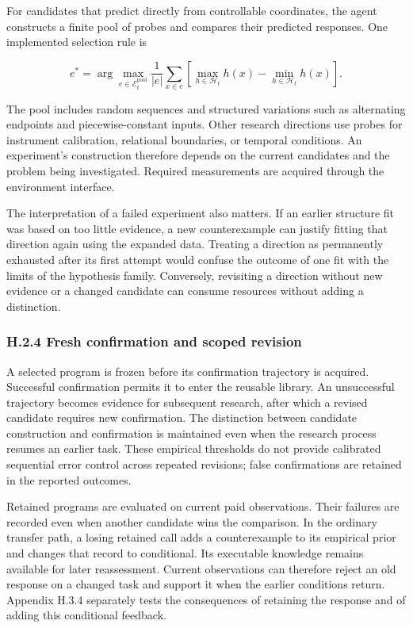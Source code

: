 \documentclass[11pt,a4paper]{article}
\begin{document}
For candidates that predict directly from controllable coordinates, the agent constructs a finite pool of probes and compares their predicted responses. One implemented selection rule is


\[
e^*=\arg\max_{e\in\mathcal E_t^{\mathrm{pool}}}
\frac{1}{|e|}\sum_{x\in e}
\left[\max_{h\in\mathcal H_t}h(x)-\min_{h\in\mathcal H_t}h(x)\right].
\]


The pool includes random sequences and structured variations such as alternating endpoints and piecewise-constant inputs. Other research directions use probes for instrument calibration, relational boundaries, or temporal conditions. An experiment's construction therefore depends on the current candidates and the problem being investigated. Required measurements are acquired through the environment interface.


The interpretation of a failed experiment also matters. If an earlier structure fit was based on too little evidence, a new counterexample can justify fitting that direction again using the expanded data. Treating a direction as permanently exhausted after its first attempt would confuse the outcome of one fit with the limits of the hypothesis family. Conversely, revisiting a direction without new evidence or a changed candidate can consume resources without adding a distinction.


\subsubsection*{H.2.4 Fresh confirmation and scoped revision}

A selected program is frozen before its confirmation trajectory is acquired. Successful confirmation permits it to enter the reusable library. An unsuccessful trajectory becomes evidence for subsequent research, after which a revised candidate requires new confirmation. The distinction between candidate construction and confirmation is maintained even when the research process resumes an earlier task. These empirical thresholds do not provide calibrated sequential error control across repeated revisions; false confirmations are retained in the reported outcomes.


Retained programs are evaluated on current paid observations. Their failures are recorded even when another candidate wins the comparison. In the ordinary transfer path, a losing retained call adds a counterexample to its empirical prior and changes that record to conditional. Its executable knowledge remains available for later reassessment. Current observations can therefore reject an old response on a changed task and support it when the earlier conditions return. Appendix H.3.4 separately tests the consequences of retaining the response and of adding this conditional feedback.
\end{document}
